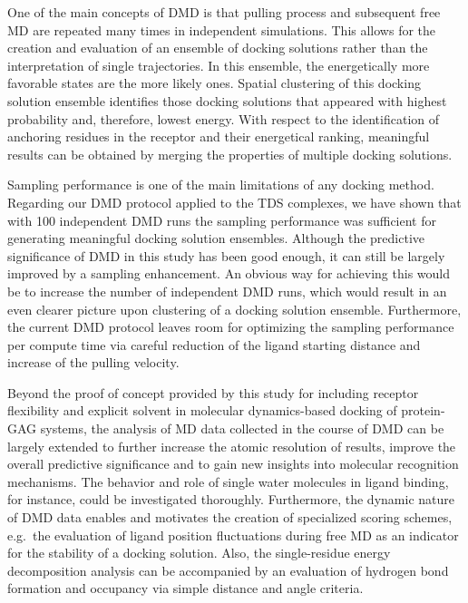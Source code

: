 One of the main concepts of DMD is that pulling process and subsequent free MD
are repeated many times in independent simulations. This allows for the creation
and evaluation of an ensemble of docking solutions rather than the
interpretation of single trajectories. In this ensemble, the energetically more
favorable states are the more likely ones. Spatial clustering of this docking
solution ensemble identifies those docking solutions that appeared with highest
probability and, therefore, lowest energy. With respect to the identification of
anchoring residues in the receptor and their energetical ranking, meaningful
results can be obtained by merging the properties of multiple docking solutions.

Sampling performance is one of the main limitations of any docking method.
Regarding our DMD protocol applied to the TDS complexes, we have shown that with
100 independent DMD runs the sampling performance was sufficient for generating
meaningful docking solution ensembles. Although the predictive significance of
DMD in this study has been good enough, it can still be largely improved by a
sampling enhancement. An obvious way for achieving this would be to increase the
number of independent DMD runs, which would result in an even clearer picture
upon clustering of a docking solution ensemble. Furthermore, the current DMD
protocol leaves room for optimizing the sampling performance per compute time
via careful reduction of the ligand starting distance and increase of the
pulling velocity.

Beyond the proof of concept provided by this study for including receptor
flexibility and explicit solvent in molecular dynamics-based docking of protein-
GAG systems, the analysis of MD data collected in the course of DMD can be
largely extended to further increase the atomic resolution of results, improve
the overall predictive significance and to gain new insights into molecular
recognition mechanisms. The behavior and role of single water molecules in
ligand binding, for instance, could be investigated thoroughly. Furthermore, the
dynamic nature of DMD data enables and motivates the creation of specialized
scoring schemes, e.g.\ the evaluation of ligand position fluctuations during
free MD as an indicator for the stability of a docking solution. Also, the
single-residue energy decomposition analysis can be accompanied by an evaluation
of hydrogen bond formation and occupancy via simple distance and angle criteria.

